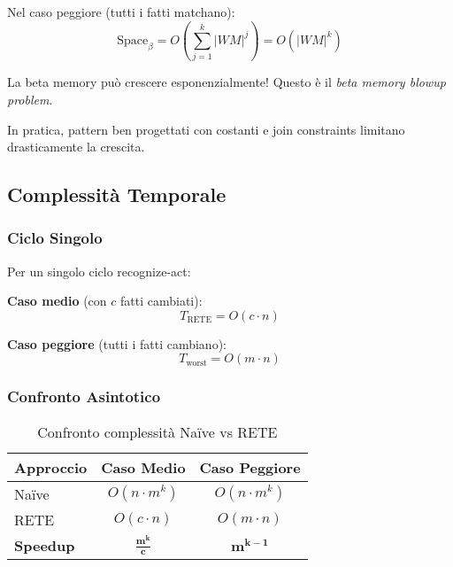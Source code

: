 Nel caso peggiore (tutti i fatti matchano):
\begin{equation}
\text{Space}_\beta = O\left(\sum_{j=1}^{k} |WM|^j\right) = O(|WM|^k)
\end{equation}

\begin{warningbox}
La beta memory può crescere esponenzialmente! Questo è il \textit{beta memory blowup problem}.

In pratica, pattern ben progettati con costanti e join constraints limitano drasticamente la crescita.
\end{warningbox}

\subsection{Complessità Temporale}

\subsubsection{Ciclo Singolo}

Per un singolo ciclo recognize-act:

\textbf{Caso medio} (con $c$ fatti cambiati):
\begin{equation}
T_{\text{RETE}} = O(c \cdot n)
\end{equation}

\textbf{Caso peggiore} (tutti i fatti cambiano):
\begin{equation}
T_{\text{worst}} = O(m \cdot n)
\end{equation}

\subsubsection{Confronto Asintotico}

\begin{table}[h]
\centering
\begin{tabular}{@{}lcc@{}}
\toprule
\textbf{Approccio} & \textbf{Caso Medio} & \textbf{Caso Peggiore} \\
\midrule
Naïve & $O(n \cdot m^k)$ & $O(n \cdot m^k)$ \\
RETE & $O(c \cdot n)$ & $O(m \cdot n)$ \\
\midrule
\textbf{Speedup} & $\mathbf{\frac{m^k}{c}}$ & $\mathbf{m^{k-1}}$ \\
\bottomrule
\end{tabular}
\caption{Confronto complessità Naïve vs RETE}
\label{tab:complexity_comparison}
\end{table}

